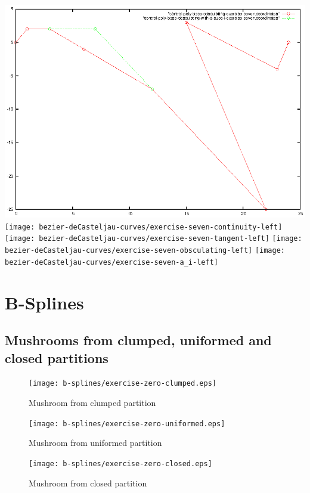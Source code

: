 \documentclass{article}
\begin{document}
\includegraphics{bezier-deCasteljau-curves/exercise-seven-a_succ_i}
\texttt{[image: bezier-deCasteljau-curves/exercise-seven-continuity-left]}
\texttt{[image: bezier-deCasteljau-curves/exercise-seven-tangent-left]}
\texttt{[image: bezier-deCasteljau-curves/exercise-seven-obsculating-left]}
\texttt{[image: bezier-deCasteljau-curves/exercise-seven-a\_i-left]}

\section{B-Splines}

\subsection{Mushrooms from clumped, uniformed and closed partitions}
\begin{figure}
  \centering
  \texttt{[image: b-splines/exercise-zero-clumped.eps]}
  \caption{Mushroom from clumped partition}
  \label{fig:clumpled-mushroom}
\end{figure}

\begin{figure}
  \centering
  \texttt{[image: b-splines/exercise-zero-uniformed.eps]}
  \caption{Mushroom from uniformed partition}
  \label{fig:uniformed-mushroom}
\end{figure}

\begin{figure}
  \centering
  \texttt{[image: b-splines/exercise-zero-closed.eps]}
  \caption{Mushroom from closed partition}
  \label{fig:closed-mushroom}
\end{figure}
\end{document}
